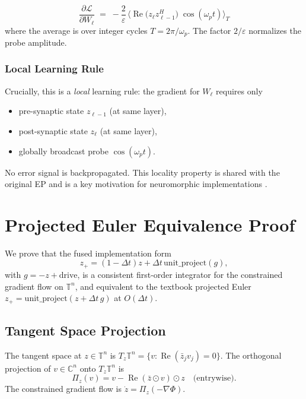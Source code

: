 \documentclass[11pt]{article}
\newcommand{\C}{\mathbb{C}}
\newcommand{\T}{\mathbb{T}}
\newcommand{\dt}{\Delta t}
\newcommand{\unitproject}{\mathrm{unit\_project}}
\DeclareMathOperator{\Real}{Re}
\begin{document}
\begin{equation}\boxed{
\frac{\partial \mathcal{L}}{\partial W_\ell}
\;=\;
-\frac{2}{\varepsilon}\,
\Big\langle \Real\big(z_\ell z_{\ell-1}^H\big)\;\cos(\omega_p t) \Big\rangle_T
}\label{eq:lockin-gradient-final}
\end{equation}
where the average is over integer cycles $T = 2\pi/\omega_p$. The factor $2/\varepsilon$ normalizes the probe amplitude.

\subsubsection{Local Learning Rule}
Crucially, this is a \emph{local} learning rule: the gradient for $W_\ell$ requires only
\begin{itemize}
\item pre-synaptic state $z_{\ell-1}$ (at same layer),
\item post-synaptic state $z_\ell$ (at same layer),
\item globally broadcast probe $\cos(\omega_p t)$.
\end{itemize}
No error signal is backpropagated. This locality property is shared with the original EP \citep{scellier2017equilibrium} and is a key motivation for neuromorphic implementations \citep{ororbia2023brain,whittington2019theories}.

\section{Projected Euler Equivalence Proof}\label{sec:projected-euler-proof}

We prove that the fused implementation form \citep{olin2021deep}
\begin{equation}\label{eq:impl-form}
z_+ = (1-\dt)z + \dt\, \unitproject(g),
\end{equation}
with $g = -z + \text{drive}$, is a consistent first-order integrator for the constrained gradient flow on $\T^n$, and equivalent to the textbook projected Euler $z_+ = \unitproject(z + \dt\, g)$ at $O(\dt)$.

\subsection{Tangent Space Projection}

The tangent space at $z \in \T^n$ is $T_z\T^n = \{ v : \Real(\bar{z}_j v_j) = 0 \}$. The orthogonal projection of $v \in \C^n$ onto $T_z\T^n$ is
\begin{equation}
\Pi_z(v) = v - \Real(\bar{z} \odot v) \odot z \quad\text{(entrywise)}.
\end{equation}
The constrained gradient flow is $\dot{z} = \Pi_z(-\nabla\Phi)$.
\end{document}
